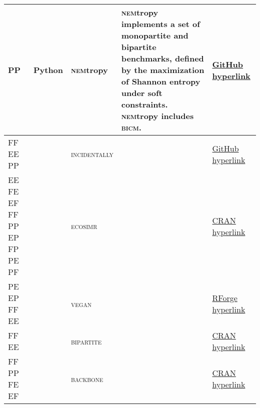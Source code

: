 \documentclass[]{article}
\begin{document}
\begin{table}[!htp]
\begin{tabularx}{\columnwidth}{X|X|X|X|X}
		PP &\faPython Python &\textsc{nem}tropy &\textsc{nem}tropy  implements a set of monopartite and bipartite benchmarks, defined by the maximization of Shannon entropy under soft constraints. \textsc{nem}tropy  includes \textsc{bicm}. &\href{https://github.com/nicoloval/NEMtropy}{GitHub hyperlink} \\[2pt] \hline
		FF EE PP &\faRProject  &\textsc{incidentally} & &\href{https://rdrr.io/github/zpneal/incidentally/}{GitHub hyperlink} \\[2pt] \hline
		EE FE EF FF PP EP FP PE PF &\faRProject  &\textsc{ecosimr} & &\href{https://rdrr.io/cran/EcoSimR/man/sim9.html}{CRAN hyperlink} \\[2pt] \hline
		PE EP FF EE &\faRProject  &\textsc{vegan} & &\href{https://rdrr.io/rforge/vegan/man/commsim.html}{RForge hyperlink} \\[2pt] \hline
		FF EE  &\faRProject  &\textsc{bipartite} & &\href{https://cran.r-project.org/web/packages/bipartite/index.html}{CRAN hyperlink} \\[2pt] \hline
		FF PP FE EF &\faRProject  &\textsc{backbone} & &\href{https://cran.r-project.org/web/packages/backbone/vignettes/backbone.html}{CRAN hyperlink} \\
		\bottomrule
	\end{tabularx}
\end{table}
\end{document}

